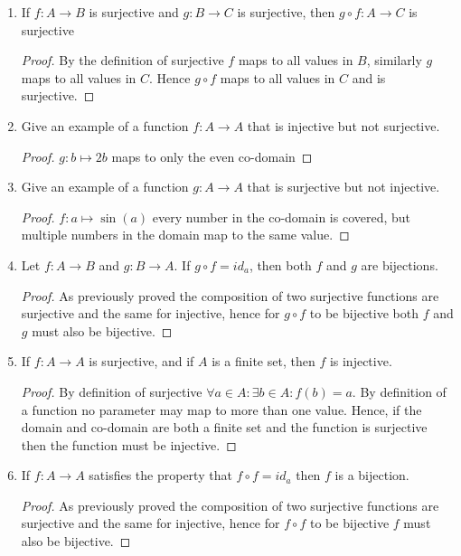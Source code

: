 \documentclass{article}
\begin{document}
\begin{enumerate}
\begin{proof}
    \end{proof}
  \item If $f : A\to B$ is surjective and $g : B\to C$ is surjective, then $g \circ f : A\to C$ is surjective 
    \begin{proof}
         By the definition of surjective $f$ maps to all values in $B$, similarly $g$ maps to all values in $C$. Hence $g \circ f$ maps to all values in $C$ and is surjective. 
    \end{proof}
  \item Give an example of a function $f : A\to A$ that is injective but not surjective.
    \begin{proof}
      $g : b\mapsto 2b$ maps to only the even co-domain
    \end{proof}
  \item Give an example of a function $g : A\to A$ that is surjective but not injective. 
    \begin{proof}
       $f : a\mapsto \sin(a) $ every number in the co-domain is covered, but multiple numbers in the domain map to the same value.
    \end{proof}
  \item Let $f : A\to B$ and $g : B\to A$. If $g \circ f = id_{a}$, then both $f$ and $g$ are bijections.
   \begin{proof}
      As previously proved the composition of two surjective functions are surjective and the same for injective, hence for $g \circ f$ to be bijective both $f$ and $g$ must also be bijective.
    \end{proof}
  \item If $f : A\to A$ is surjective, and if $A$ is a finite set, then $f$ is injective.
    \begin{proof}
By definition of surjective $\forall a\in A: \exists b\in A: f(b) = a$. By definition of a function no parameter may map to more than one value. Hence, if the domain and co-domain are both a finite set and the function is surjective then the function must be injective.
    \end{proof}
  \item If $f : A\to A$ satisfies the property that $f \circ f = id_{a}$ then $f$ is a bijection.
    \begin{proof}
      As previously proved the composition of two surjective functions are surjective and the same for injective, hence for $f \circ f$ to be bijective $f$ must also be bijective.
    \end{proof}
  \end{enumerate}
\end{document}
